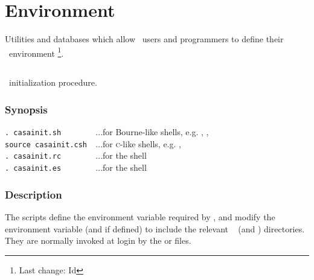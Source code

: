 \chapter{Environment}
\label{Environment}

Utilities and databases which allow \aipspp\ users and programmers to
define their \aipspp\ environment \footnote{Last change:
$ $Id$ $}.


\section{}
\label{casainit}
\label{casainit.csh}
\label{casainit.sh}

\aipspp\ initialization procedure.

\subsection*{Synopsis}

\begin{synopsis}
   \verb+. casainit.sh        +...for Bourne-like shells, e.g. ,
                                  ,  \\
   \verb+source casainit.csh  +...for \textsc{c}-like shells, e.g.
                                  ,  \\
   \verb+. casainit.rc        +...for the  shell \\
   \verb+. casainit.es        +...for the  shell
\end{synopsis}

\subsection*{Description}

The  scripts define the  environment variable
required by \aipspp, and modify the  environment variable (and
 if defined) to include the relevant \aipspp\  (and
) directories.  They are normally invoked at login by the
 or  files.

